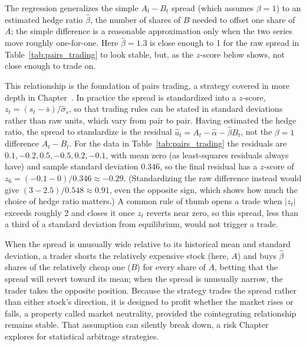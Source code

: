 \documentclass[../ai_in_finance]{subfiles}
\begin{document}
The regression generalizes the simple $A_t - B_t$ spread (which assumes $\beta=1$) to an estimated hedge ratio $\hat\beta$, the number of shares of $B$ needed to offset one share of $A$; the simple difference is a reasonable approximation only when the two series move roughly one-for-one. Here $\hat\beta=1.3$ is close enough to 1 for the raw spread in Table~\ref{tab:pairs_trading} to look stable, but, as the $z$-score below shows, not close enough to trade on.

This relationship is the foundation of pairs trading, a strategy covered in more depth in Chapter~. In practice the spread is standardized into a $z$-score, $z_t = (s_t - \bar s)/\hat\sigma_s$, so that trading rules can be stated in standard deviations rather than raw units, which vary from pair to pair. Having estimated the hedge ratio, the spread to standardize is the residual $\hat u_t = A_t - \hat\alpha - \hat\beta B_t$, not the $\beta=1$ difference $A_t - B_t$. For the data in Table~\ref{tab:pairs_trading} the residuals are $0.1, -0.2, 0.5, -0.5, 0.2, -0.1$, with mean zero (as least-squares residuals always have) and sample standard deviation $0.346$, so the final residual has a $z$-score of $z_6 = (-0.1 - 0)/0.346 \approx -0.29$. (Standardizing the raw difference instead would give $(3-2.5)/0.548 \approx 0.91$, even the opposite sign, which shows how much the choice of hedge ratio matters.) A common rule of thumb opens a trade when $|z_t|$ exceeds roughly 2 and closes it once $z_t$ reverts near zero, so this spread, less than a third of a standard deviation from equilibrium, would not trigger a trade.

When the spread is unusually wide relative to its historical mean and standard deviation, a trader shorts the relatively expensive stock (here, $A$) and buys $\hat\beta$ shares of the relatively cheap one ($B$) for every share of $A$, betting that the spread will revert toward its mean; when the spread is unusually narrow, the trader takes the opposite position.
Because the strategy trades the spread rather than either stock's direction, it is designed to profit whether the market rises or falls, a property called market neutrality, provided the cointegrating relationship remains stable. That assumption can silently break down, a risk Chapter~ explores for statistical arbitrage strategies.
\end{document}
